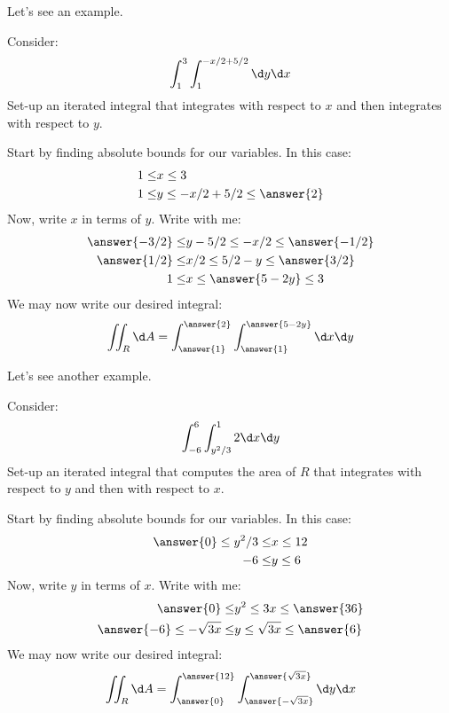 \documentclass{ximera}
\begin{document}
Let's see an example.

\begin{example}
  Consider:
  \[
  \int_1^3 \int_1^{-x/2 +5/2}\d y \d x
  \]
  Set-up an iterated integral that integrates with respect to $x$ and
  then integrates with respect to $y$.
  \begin{explanation}
    Start by finding absolute bounds for our variables. In this case:
    \begin{align*}
      1\le &x \le 3\\
      1\le &y \le -x/2 + 5/2 \le \answer{2}
    \end{align*}
    Now, write $x$ in terms of $y$. Write with me:
    \begin{align*}
      \answer{-3/2}\le &y -5/2 \le -x/2  \le \answer{-1/2}\\
      \answer{1/2}\le &x/2 \le 5/2-y  \le \answer{3/2}\\
      1\le & x\le \answer{5-2y}  \le 3
    \end{align*}
    We may now write our desired integral:
    \[
    \iint_R \d A = \int_{\answer{1}}^{\answer{2}}\int_{\answer{1}}^{\answer{5-2y}} \d x \d y
    \]
  \end{explanation}
\end{example}

Let's see another example.


\begin{example}
  Consider:
  \[
  \int_{-6}^6 \int_{y^2/3}^12 \d x \d y 
  \]
  Set-up an iterated integral that computes the area of $R$ that
  integrates with respect to $y$ and then with respect to $x$.
  \begin{explanation}
    Start by finding absolute bounds for our variables. In this case:
    \begin{align*}
      \answer{0}\le y^2/3\le &x \le 12\\
      -6\le &y \le 6
    \end{align*}
    Now, write $y$ in terms of $x$. Write with me:
    \begin{align*}
      \answer{0}\le &y^2 \le 3x \le \answer{36}\\
      \answer{-6}\le -\sqrt{3x}\le &y \le \sqrt{3x} \le \answer{6}\\
    \end{align*}
    We may now write our desired integral:
    \[
    \iint_R \d A = \int_{\answer{0}}^{\answer{12}}\int_{\answer{-\sqrt{3x}}}^{\answer{\sqrt{3x}}} \d y \d x
    \]
  \end{explanation}
\end{example}
\end{document}
